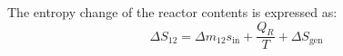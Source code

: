 The entropy change of the reactor contents is expressed as:  
\[
\Delta S_{12} = \Delta m_{12} s_{\text{in}} + \frac{Q_{R}}{T} + \Delta S_{\text{gen}}
\]
